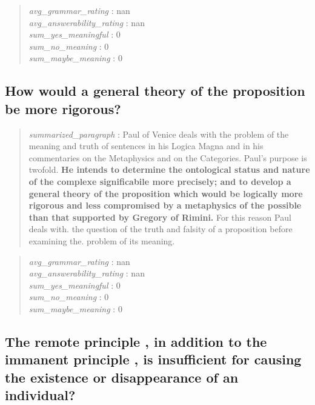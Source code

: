 \begin{quote}
\emph{avg\_grammar\_rating} : nan\\
\emph{avg\_answerability\_rating} : nan\\
\emph{sum\_yes\_meaningful} : 0\\
\emph{sum\_no\_meaning} : 0\\
\emph{sum\_maybe\_meaning} : 0
\end{quote}

\hypertarget{how-would-a-general-theory-of-the-proposition-be-more-rigorous}{%
\subsection{How would a general theory of the proposition be more
rigorous?}\label{how-would-a-general-theory-of-the-proposition-be-more-rigorous}}

\begin{quote}
\emph{summarized\_paragraph} : Paul of Venice deals with the problem of
the meaning and truth of sentences in his Logica Magna and in his
commentaries on the Metaphysics and on the Categories. Paul's purpose is
twofold. \textbf{He intends to determine the ontological status and
nature of the complexe significabile more precisely; and to develop a
general theory of the proposition which would be logically more rigorous
and less compromised by a metaphysics of the possible than that
supported by Gregory of Rimini.} For this reason Paul deals with. the
question of the truth and falsity of a proposition before examining the.
problem of its meaning.
\end{quote}

\begin{quote}
\emph{avg\_grammar\_rating} : nan\\
\emph{avg\_answerability\_rating} : nan\\
\emph{sum\_yes\_meaningful} : 0\\
\emph{sum\_no\_meaning} : 0\\
\emph{sum\_maybe\_meaning} : 0
\end{quote}

\hypertarget{the-remote-principle-in-addition-to-the-immanent-principle-is-insufficient-for-causing-the-existence-or-disappearance-of-an-individual}{%
\subsection{The remote principle , in addition to the immanent principle
, is insufficient for causing the existence or disappearance of an
individual?}\label{the-remote-principle-in-addition-to-the-immanent-principle-is-insufficient-for-causing-the-existence-or-disappearance-of-an-individual}}


